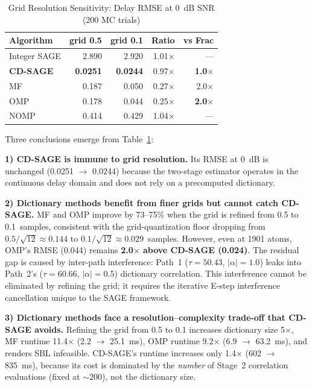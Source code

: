 \documentclass[journal]{IEEEtran}
\begin{document}
\begin{table}[t]
\centering
\caption{Grid Resolution Sensitivity: Delay RMSE at \SI{0}{dB} SNR (200 MC trials)}
\label{tab:grid_compare}
\footnotesize
\begin{tabular}{@{}lrrrr@{}}
\toprule
Algorithm & grid 0.5 & grid 0.1 & Ratio & vs Frac \\
\midrule
Integer SAGE & 2.890 & 2.920 & 1.01$\times$ & --- \\
\textbf{CD-SAGE} & \textbf{0.0251} & \textbf{0.0244} & 0.97$\times$ & \textbf{1.0$\times$} \\
MF  & 0.187 & 0.050 & 0.27$\times$ & 2.0$\times$ \\
OMP & 0.178 & 0.044 & 0.25$\times$ & \textbf{2.0$\times$} \\
NOMP & 0.414 & 0.429 & 1.04$\times$ & --- \\
\bottomrule
\end{tabular}
\end{table}

Three conclusions emerge from Table~\ref{tab:grid_compare}:

\textbf{1) CD-SAGE is immune to grid resolution.} Its RMSE at \SI{0}{dB} is unchanged (0.0251 $\to$ 0.0244) because the two-stage estimator operates in the continuous delay domain and does not rely on a precomputed dictionary.

\textbf{2) Dictionary methods benefit from finer grids but cannot catch CD-SAGE.} MF and OMP improve by 73--75\% when the grid is refined from 0.5 to 0.1~samples, consistent with the grid-quantization floor dropping from $0.5/\sqrt{12} \approx 0.144$ to $0.1/\sqrt{12} \approx 0.029$~samples. However, even at 1901 atoms, OMP's RMSE (0.044) remains \textbf{2.0$\times$ above CD-SAGE (0.024)}. The residual gap is caused by inter-path interference: Path~1 ($\tau=50.43$, $|\alpha|=1.0$) leaks into Path~2's ($\tau=60.66$, $|\alpha|=0.5$) dictionary correlation. This interference cannot be eliminated by refining the grid; it requires the iterative E-step interference cancellation unique to the SAGE framework.

\textbf{3) Dictionary methods face a resolution--complexity trade-off that CD-SAGE avoids.} Refining the grid from 0.5 to 0.1 increases dictionary size 5$\times$, MF runtime 11.4$\times$ (2.2 $\to$ \SI{25.1}{ms}), OMP runtime 9.2$\times$ (6.9 $\to$ \SI{63.2}{ms}), and renders SBL infeasible. CD-SAGE's runtime increases only 1.4$\times$ (602 $\to$ \SI{835}{ms}), because its cost is dominated by the \textit{number} of Stage~2 correlation evaluations (fixed at $\sim$200), not the dictionary size.
\end{document}
